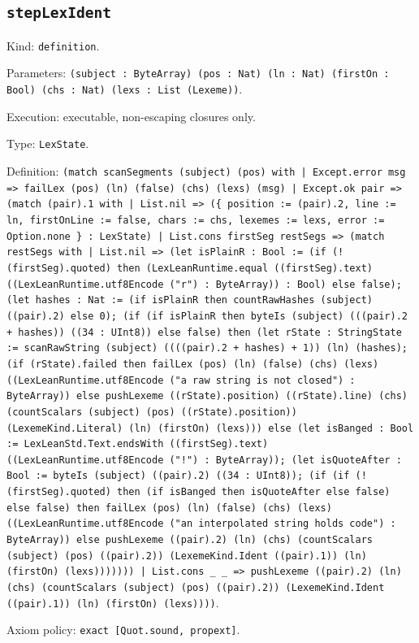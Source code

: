 \documentclass[11pt]{article}
\begin{document}
\subsection*{\texttt{stepLexIdent}}
\noindent Kind: \texttt{definition}.\par
\noindent Parameters: \texttt{(subject : ByteArray) (pos : Nat) (ln : Nat) (firstOn : Bool) (chs : Nat) (lexs : List (Lexeme))}.\par
\noindent Execution: executable, non-escaping closures only.\par
\noindent Type: \texttt{LexState}.\par
\noindent Definition: \texttt{(match scanSegments (subject) (pos) with | Except.error msg => failLex (pos) (ln) (false) (chs) (lexs) (msg) | Except.ok pair => (match (pair).1 with | List.nil => (\{ position := (pair).2, line := ln, firstOnLine := false, chars := chs, lexemes := lexs, error := Option.none \} : LexState) | List.cons firstSeg restSegs => (match restSegs with | List.nil => (let isPlainR : Bool := (if (!(firstSeg).quoted) then (LexLeanRuntime.equal ((firstSeg).text) ((LexLeanRuntime.utf8Encode ("r") : ByteArray)) : Bool) else false); (let hashes : Nat := (if isPlainR then countRawHashes (subject) ((pair).2) else 0); (if (if isPlainR then byteIs (subject) (((pair).2 + hashes)) ((34 : UInt8)) else false) then (let rState : StringState := scanRawString (subject) ((((pair).2 + hashes) + 1)) (ln) (hashes); (if (rState).failed then failLex (pos) (ln) (false) (chs) (lexs) ((LexLeanRuntime.utf8Encode ("a raw string is not closed") : ByteArray)) else pushLexeme ((rState).position) ((rState).line) (chs) (countScalars (subject) (pos) ((rState).position)) (LexemeKind.Literal) (ln) (firstOn) (lexs))) else (let isBanged : Bool := LexLeanStd.Text.endsWith ((firstSeg).text) ((LexLeanRuntime.utf8Encode ("!") : ByteArray)); (let isQuoteAfter : Bool := byteIs (subject) ((pair).2) ((34 : UInt8)); (if (if (!(firstSeg).quoted) then (if isBanged then isQuoteAfter else false) else false) then failLex (pos) (ln) (false) (chs) (lexs) ((LexLeanRuntime.utf8Encode ("an interpolated string holds code") : ByteArray)) else pushLexeme ((pair).2) (ln) (chs) (countScalars (subject) (pos) ((pair).2)) (LexemeKind.Ident ((pair).1)) (ln) (firstOn) (lexs))))))) | List.cons \_ \_ => pushLexeme ((pair).2) (ln) (chs) (countScalars (subject) (pos) ((pair).2)) (LexemeKind.Ident ((pair).1)) (ln) (firstOn) (lexs))))}.\par
\noindent Axiom policy: \texttt{exact [Quot.sound, propext]}.\par
\end{document}
